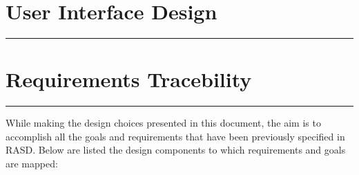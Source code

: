 \documentclass[12pt]{article}
\begin{document}
\section{User Interface Design}
\hrule
\newpage

\newpage
\section{Requirements Tracebility}
\hrule
\vspace{5mm}
While making the design choices presented in this document, the aim is to accomplish all the goals and requirements that have been previously specified in RASD. Below are listed the design components to which requirements and goals are mapped: 
\end{document}

